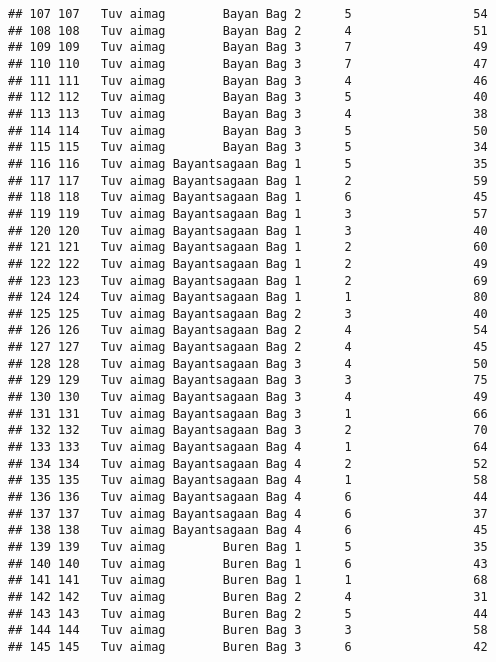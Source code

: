 \documentclass[
]{article}
\begin{document}
\begin{verbatim}
## 107 107   Tuv aimag        Bayan Bag 2      5                 54
## 108 108   Tuv aimag        Bayan Bag 2      4                 51
## 109 109   Tuv aimag        Bayan Bag 3      7                 49
## 110 110   Tuv aimag        Bayan Bag 3      7                 47
## 111 111   Tuv aimag        Bayan Bag 3      4                 46
## 112 112   Tuv aimag        Bayan Bag 3      5                 40
## 113 113   Tuv aimag        Bayan Bag 3      4                 38
## 114 114   Tuv aimag        Bayan Bag 3      5                 50
## 115 115   Tuv aimag        Bayan Bag 3      5                 34
## 116 116   Tuv aimag Bayantsagaan Bag 1      5                 35
## 117 117   Tuv aimag Bayantsagaan Bag 1      2                 59
## 118 118   Tuv aimag Bayantsagaan Bag 1      6                 45
## 119 119   Tuv aimag Bayantsagaan Bag 1      3                 57
## 120 120   Tuv aimag Bayantsagaan Bag 1      3                 40
## 121 121   Tuv aimag Bayantsagaan Bag 1      2                 60
## 122 122   Tuv aimag Bayantsagaan Bag 1      2                 49
## 123 123   Tuv aimag Bayantsagaan Bag 1      2                 69
## 124 124   Tuv aimag Bayantsagaan Bag 1      1                 80
## 125 125   Tuv aimag Bayantsagaan Bag 2      3                 40
## 126 126   Tuv aimag Bayantsagaan Bag 2      4                 54
## 127 127   Tuv aimag Bayantsagaan Bag 2      4                 45
## 128 128   Tuv aimag Bayantsagaan Bag 3      4                 50
## 129 129   Tuv aimag Bayantsagaan Bag 3      3                 75
## 130 130   Tuv aimag Bayantsagaan Bag 3      4                 49
## 131 131   Tuv aimag Bayantsagaan Bag 3      1                 66
## 132 132   Tuv aimag Bayantsagaan Bag 3      2                 70
## 133 133   Tuv aimag Bayantsagaan Bag 4      1                 64
## 134 134   Tuv aimag Bayantsagaan Bag 4      2                 52
## 135 135   Tuv aimag Bayantsagaan Bag 4      1                 58
## 136 136   Tuv aimag Bayantsagaan Bag 4      6                 44
## 137 137   Tuv aimag Bayantsagaan Bag 4      6                 37
## 138 138   Tuv aimag Bayantsagaan Bag 4      6                 45
## 139 139   Tuv aimag        Buren Bag 1      5                 35
## 140 140   Tuv aimag        Buren Bag 1      6                 43
## 141 141   Tuv aimag        Buren Bag 1      1                 68
## 142 142   Tuv aimag        Buren Bag 2      4                 31
## 143 143   Tuv aimag        Buren Bag 2      5                 44
## 144 144   Tuv aimag        Buren Bag 3      3                 58
## 145 145   Tuv aimag        Buren Bag 3      6                 42

\end{verbatim}
\end{document}
